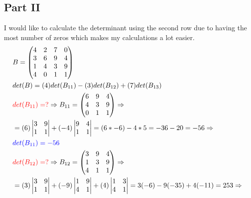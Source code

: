 \documentclass[a4paper,12pt]{article}
\begin{document}
\subsection{Part II}
\begin{doublespace}
I would like to calculate the determinant using the second row due to having the most number of zeros which makes my calculations a lot easier.
	\begin{align*}
		&B = \begin{pmatrix} 4 & 2 & 7 & 0\\ 3 & 6 & 9 & 4\\ 1 &4 & 3 & 9\\ 4 & 0 & 1 & 1\\ \end{pmatrix}\\
		& det(B) = (4) det(B_{11}) -  (3) det(B_{12}) +  (7) det(B_{13})  \\
		& \textcolor{red}{det(B_{11}) = ? } \Rightarrow  B_{11} = \begin{pmatrix} 6 & 9 & 4\\ 4  & 3 & 9\\ 0 & 1 & 1\\ \end{pmatrix} \Rightarrow \\%
		& = (6)\begin{vmatrix} 3 & 9  \\ 1 & 1 \\ \end{vmatrix}  + (-4)\begin{vmatrix} 9 & 4 \\ 1 & 1  \\ \end{vmatrix} = (6*-6 ) - 4*5 =  -36 -20 = -56 \Rightarrow \\
		& \textcolor{blue}{det(B_{11}) =  -56 } \\
		& \textcolor{red}{det(B_{12}) = ? } \Rightarrow  B_{12} = \begin{pmatrix} 3 & 9 & 4\\ 1  & 3 & 9\\ 4 & 1 & 1\\ \end{pmatrix} \Rightarrow \\%
		& = (3)\begin{vmatrix} 3 & 9  \\ 1 & 1 \\ \end{vmatrix}  + (-9)\begin{vmatrix} 1 & 9 \\ 4 & 1  \\ \end{vmatrix} + (4)\begin{vmatrix} 1 & 3 \\ 4 & 1  \\ \end{vmatrix} = 3(-6) -9(-35) + 4(-11) = 253 \Rightarrow \\

\end{align*}
\end{doublespace}
\end{document}
